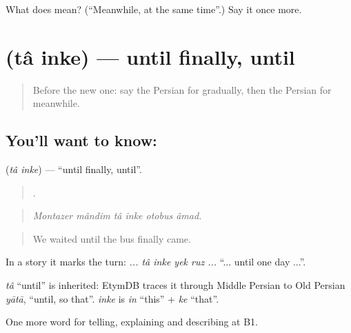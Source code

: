 \begin{tcolorbox}[breakable,colback=teal!4,colframe=teal!35!black,title={Before you move on}]
What does    mean? (\textquotedblleft{}Meanwhile, at the same time\textquotedblright{}.) Say it once more.
\end{tcolorbox}
\section[\texorpdfstring{\fa{تا} \fa{اینکه} (tâ inke)}{تا اینکه (tâ inke)}]{  (tâ inke) — until finally, until}

\label{lesson:FA-C306-ta-inke}



\begin{quote}
Before the new one: say the Persian for gradually, then the Persian for meanwhile.
\end{quote}

\subsection*{You'll want to know:  }
\textbf{ } (\emph{tâ inke}) — \textquotedblleft{}until finally, until\textquotedblright{}.

\begin{quote}
     .
\end{quote}

\begin{quote}
\emph{Montazer mândim tâ inke otobus âmad.}
\end{quote}

\begin{quote}
We waited until the bus finally came.
\end{quote}

In a story it marks the turn: \emph{... tâ inke yek ruz ...} \textquotedblleft{}... until one day ...\textquotedblright{}.

\begin{cousinweb}
\emph{tâ} \textquotedblleft{}until\textquotedblright{} is inherited: EtymDB traces it through Middle Persian to Old Persian \emph{yātā}, \textquotedblleft{}until, so that\textquotedblright{}. \emph{inke} is \emph{in} \textquotedblleft{}this\textquotedblright{} + \emph{ke} \textquotedblleft{}that\textquotedblright{}.
\end{cousinweb}

\begin{grammarlens}[title={What you've built}]
One more word for telling, explaining and describing at B1.
\end{grammarlens}

